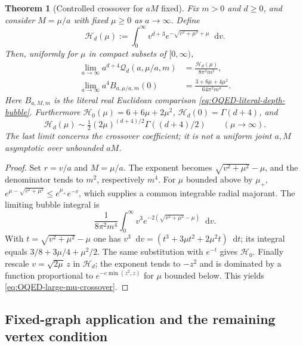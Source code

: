 \documentclass[final,5p,times,twocolumn,numbers,nopreprintline]{elsarticle}
\numberwithin{equation}{section}
\newtheorem{theorem}{Theorem}[section]
\theoremstyle{definition}
\theoremstyle{remark}
\newcommand{\dd}{\mathop{}\!\mathrm d}
\begin{document}
\begin{theorem}[Controlled crossover for $aM$ fixed]
\label{thm:OQED-strong-depth-crossover}
Fix $m>0$ and $d\geq0$, and consider $M=\mu/a$ with fixed
$\mu\geq0$ as $a\to\infty$. Define
\begin{equation}
 \mathcal H_d(\mu):=\int_0^\infty v^{d+3}
                  e^{-\sqrt{v^2+\mu^2}+\mu}\dd v.
 \label{eq:OQED-crossover-H}
\end{equation}
Then, uniformly for $\mu$ in compact subsets of $[0,\infty)$,
\begin{equation}
 \begin{aligned}
 \lim_{a\to\infty}a^{d+4}\mathscr Q_d(a,\mu/a,m)
    &=\frac{\mathcal H_d(\mu)}{8\pi^2m^2},\\
 \lim_{a\to\infty}a^4B_{a,\mu/a,m}(0)
    &=\frac{3+6\mu+4\mu^2}{64\pi^2m^4}.
 \end{aligned}
 \label{eq:OQED-strong-depth-crossover}
\end{equation}
Here $B_{a,M,m}$ is the literal real Euclidean comparison
\eqref{eq:OQED-literal-depth-bubble}. Furthermore $\mathcal H_0(\mu)=6+6\mu+2\mu^2$,
$\mathcal H_d(0)=\Gamma(d+4)$, and
\begin{equation}
 \mathcal H_d(\mu)\sim\tfrac12(2\mu)^{(d+4)/2}
          \Gamma((d+4)/2)\qquad(\mu\to\infty).
 \label{eq:OQED-large-mu-crossover}
\end{equation}
The last limit concerns the crossover coefficient; it is not a
uniform joint $a,M$ asymptotic over unbounded $aM$.
\end{theorem}
\begin{proof}
Set $r=v/a$ and $M=\mu/a$. The exponent becomes
$\sqrt{v^2+\mu^2}-\mu$, and the denominator tends to $m^2$,
respectively $m^4$. For $\mu$ bounded above by $\mu_+$,
$e^{\mu-\sqrt{v^2+\mu^2}}\leq e^{\mu_+}e^{-v}$,
which supplies a common integrable radial majorant.
The limiting bubble integral is
\[
 \frac1{8\pi^2m^4}\int_0^\infty v^3
  e^{-2(\sqrt{v^2+\mu^2}-\mu)}\dd v.
\]
With $t=\sqrt{v^2+\mu^2}-\mu$ one has
$v^3\dd v=(t^3+3\mu t^2+2\mu^2t)\dd t$;
its integral equals $3/8+3\mu/4+\mu^2/2$.
The same substitution with $e^{-t}$ gives $\mathcal H_0$.
Finally rescale $v=\sqrt{2\mu}\,z$ in $\mathcal H_d$;
the exponent tends to $-z^2$ and is dominated by a function
proportional to $e^{-c\min(z^2,z)}$ for $\mu$ bounded below.
This yields \eqref{eq:OQED-large-mu-crossover}.
\end{proof}

\subsection{Fixed-graph application and the remaining vertex condition}
\label{sec:OQED-graph-application}
\end{document}
